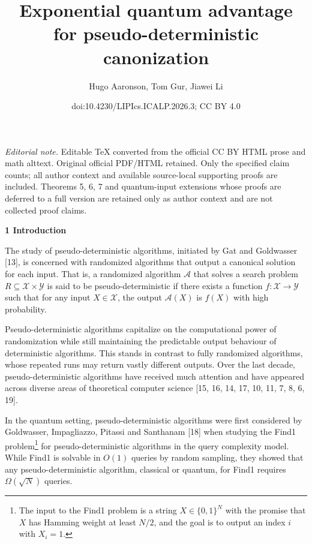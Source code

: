 \documentclass[10pt,a4paper]{article}
\title{Exponential quantum advantage for pseudo-deterministic canonization}
\author{Hugo Aaronson, Tom Gur, Jiawei Li}
\date{doi:10.4230/LIPIcs.ICALP.2026.3; CC BY 4.0}
\begin{document}
\maketitle
\noindent\textit{Editorial note.} Editable TeX converted from the official CC BY HTML prose and math alttext. Original official PDF/HTML retained. Only the specified claim counts; all author context and available source-local supporting proofs are included. Theorems 5, 6, 7 and quantum-input extensions whose proofs are deferred to a full version are retained only as author context and are not collected proof claims.\par\medskip


\par\medskip\noindent\textbf{
1 Introduction}\par




The study of pseudo-deterministic algorithms, initiated by Gat and Goldwasser [13], is concerned with randomized algorithms that output a canonical solution for each input. That is, a randomized algorithm $\mathcal{A}$ that solves a search problem ${R}\subseteq\mathcal{X}\times\mathcal{Y}$ is said to be pseudo-deterministic if there exists a function $f:\mathcal{X}\rightarrow\mathcal{Y}$ such that for any input $X\in\mathcal{X}$, the output $\mathcal{A}(X)$ is $f(X)$ with high probability.\par




Pseudo-deterministic algorithms capitalize on the computational power of randomization while still maintaining the predictable output behaviour of deterministic algorithms. This stands in contrast to fully randomized algorithms, whose repeated runs may return vastly different outputs.
Over the last decade, pseudo-deterministic algorithms have received much attention and have appeared across diverse areas of theoretical computer science [15, 16, 14, 17, 10, 11, 7, 8, 6, 19].\par




In the quantum setting, pseudo-deterministic algorithms were first considered by Goldwasser, Impagliazzo, Pitassi and Santhanam [18] when studying the Find1 problem\footnote{The input to the Find1 problem is a string $X\in\{0,1\}^{N}$ with the promise that $X$ has Hamming weight at least $N/2$, and the goal is to output an index $i$ with $X_{i}=1$.}
for pseudo-deterministic algorithms in the query complexity model. While Find1 is solvable in $O(1)$ queries by random sampling, they showed that any pseudo-deterministic algorithm, classical or quantum, for Find1 requires ${\Omega}(\sqrt{N})$ queries.\par
\end{document}
